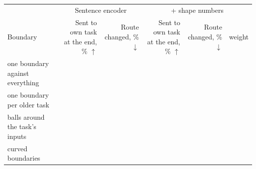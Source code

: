 {\footnotesize\setlength{\tabcolsep}{3pt}\begin{tabular}{lrrrrr}
    \toprule
    & \multicolumn{2}{c}{Sentence encoder} & \multicolumn{3}{c}{+ shape numbers} \\
    \cmidrule(lr){2-3}\cmidrule(l){4-6}
    Boundary & \shortstack[r]{Sent to\\own task\\at the end,\\\% $\uparrow$} & \shortstack[r]{Route\\changed,\\\% $\downarrow$} & \shortstack[r]{Sent to\\own task\\at the end,\\\% $\uparrow$} & \shortstack[r]{Route\\changed,\\\% $\downarrow$} & weight \\
    \midrule
    one boundary against everything & \AudShapeOvrMiniEnd{} & \AudShapeOvrMiniChanged{} & \AudShapeOvrShapeEnd{} & \AudShapeOvrShapeChanged{} & \AudShapeOvrShapeWeight{} \\
    one boundary per older task & \AudShapePairMiniEnd{} & \AudShapePairMiniChanged{} & \textbf{\AudShapePairShapeEnd{}} & \textbf{\AudShapePairShapeChanged{}} & \textbf{\AudShapePairShapeWeight{}} \\
    balls around the task's inputs & \AudShapePairKnnMiniEnd{} & \AudShapePairKnnMiniChanged{} & \AudShapePairKnnShapeEnd{} & \AudShapePairKnnShapeChanged{} & \AudShapePairKnnShapeWeight{} \\
    curved boundaries & \AudShapePairRffMiniEnd{} & \AudShapePairRffMiniChanged{} & \AudShapePairRffShapeEnd{} & \AudShapePairRffShapeChanged{} & \AudShapePairRffShapeWeight{} \\
    \bottomrule
\end{tabular}}
